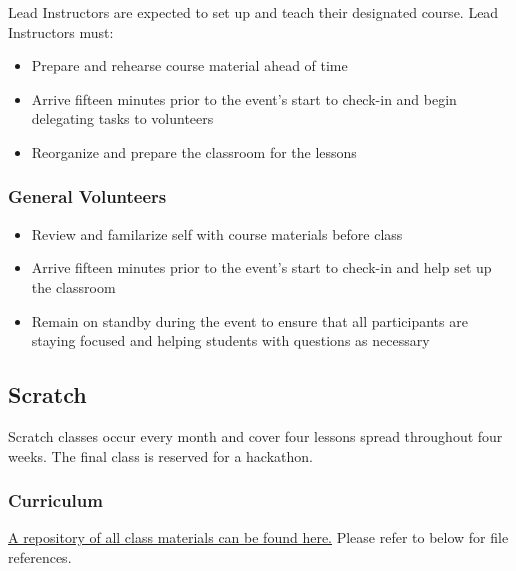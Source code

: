 \documentclass[twoside,11pt,letterpaper,abstracton]{scrartcl}
\begin{document}
Lead Instructors are expected to set up and teach their designated course. Lead Instructors must:

\begin{itemize}
    \item Prepare and rehearse course material ahead of time
    \item Arrive fifteen minutes prior to the event's start to check-in and begin delegating tasks to volunteers
    \item Reorganize and prepare the classroom for the lessons
\end{itemize}

\subsubsection{General Volunteers}

\begin{itemize}
    \item Review and familarize self with course materials before class
    \item Arrive fifteen minutes prior to the event's start to check-in and help set up the classroom
    \item Remain on standby during the event to ensure that all participants are staying focused and helping students with questions as necessary
\end{itemize}

\subsection{Scratch} \label{jcc-scratch}

Scratch classes occur every month and cover four lessons spread throughout four weeks. The final class is reserved for a hackathon.

\subsubsection{Curriculum}

\begin{resource}
    \href{https://drive.google.com/drive/folders/1tGi0jBzn00RZuYe5zxa5Sv7IjJlqwOqq?usp=sharing}{A repository of all class materials can be found here.} Please refer to below for file references.
\end{resource}

\end{document}
